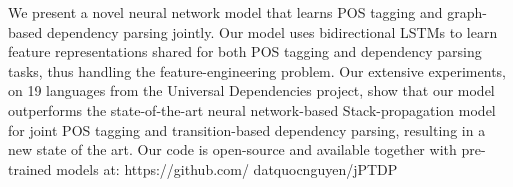 We present a novel neural network model that learns POS tagging and graph-based dependency parsing jointly. Our model uses bidirectional LSTMs to learn feature representations shared for both POS tagging and dependency parsing tasks, thus handling the feature-engineering problem. Our extensive experiments, on 19 languages from the Universal Dependencies project, show that our model outperforms the state-of-the-art neural network-based Stack-propagation model for joint POS tagging and transition-based dependency parsing, resulting in a new state of the art. Our code is open-source and available together with pre-trained models at: https://github.com/ datquocnguyen/jPTDP
